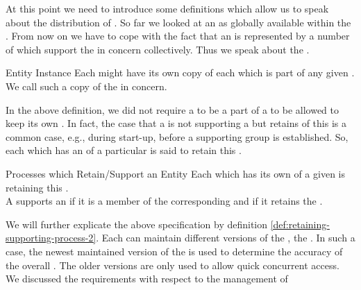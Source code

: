 \documentclass[a4paper, 12pt]{book}
\begin{document}
At this point we need to introduce some definitions which allow us to speak
about the distribution of . So far we looked at an  as
globally available within the . From now on we
have to cope with the fact that an  is represented by a number of
 which support the  in concern
collectively. Thus we speak about the . 
%
\begin{definition*}{Entity Instance}
  \label{def:entity-instance}
  Each  might have its own copy of each
   which is part of any given . We call such a
  copy  of the  in concern.
\end{definition*}
%
In the above definition, we did not require a  to be
a part of a  to be allowed to keep its own
. In fact, the case that a  is not supporting a
 but retains  of this  is a
common case, e.g., during start-up, before a supporting group is established. 
%
So, each  which has an  of a particular
 is said to retain this .
%
\begin{definition*}{Processes which Retain/Support an Entity}
  \label{def:retaining-supporting-process-1}
  Each  which has its own  of a given
   is retaining this .\\ A 
  supports an  if it is a member of the corresponding
   and if it retains the .
\end{definition*}
%
We will further explicate the above specification by definition
\vref{def:retaining-supporting-process-2}. 
%
Each  can maintain different versions of the , the . In such a case, the newest
maintained version of the  is used to determine the
  accuracy of the overall . The older versions are
only used to allow quick concurrent access. 
%
We discussed the requirements with respect to the management of
\end{document}
